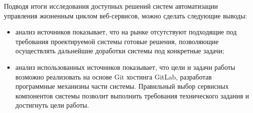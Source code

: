 Подводя итоги исследования доступных решений систем автоматизации управления жизненным циклом веб-сервисов, можно сделать следующие выводы:
\begin{itemize}
    \item анализ источников показывает, что на рынке отсутствуют подходящие под требования проектируемой системы готовые решения,
    позволяющие осуществлять дальнейшие доработки системы под конкретные задачи;
    \item анализ использованных источников показывает, что цели и задачи работы возможно реализовать на основе Git хостинга GitLab,
    разработав программные механизны части системы.
    Правильный выбор сервисных компонентов системы позволит выполнить требования технического задания и достигнуть цели работы.
\end{itemize}

